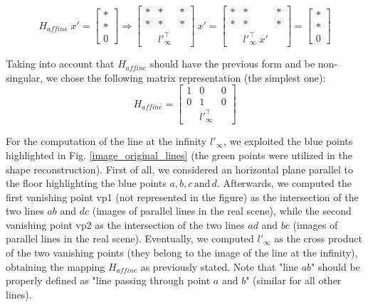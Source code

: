 \documentclass[11pt, oneside]{article}
\begin{document}
\begin{equation}
	H_{affine} \; x' = 
	\begin{bmatrix}
		* \\ * \\ 0
	\end{bmatrix}
	\Rightarrow
	\begin{bmatrix}
		* & * & * \\ * & * & * \\ & {l'}^{\intercal}_{\infty} &
	\end{bmatrix}
	\: x' =
	\begin{bmatrix}
		* & * & * \\ * & * & * \\ & {l'}^{\intercal}_{\infty} \; x' &
	\end{bmatrix}
	=
	\begin{bmatrix}
		* \\ * \\ 0
	\end{bmatrix}
\end{equation}

Taking into account that $H_{affine}$ should have the previous form and be non-singular, we chose the following matrix representation (the simplest one):
\begin{equation}
	H_{affine} =
	\begin{bmatrix}
		1 & 0 & 0 \\ 0 & 1 & 0 \\ & {l'}^{\intercal}_{\infty} &
	\end{bmatrix}
\end{equation}

For the computation of the line at the infinity $l'_{\infty}$, we exploited the blue points highlighted in Fig. \ref{image_original_lines} (the green points were utilized in the shape reconstruction). First of all, we considered an horizontal plane parallel to the floor highlighting the blue points $a, b, c \, \text{and}\, d$. Afterwards, we computed the first vanishing point vp1 (not represented in the figure) as the intersection of the two lines $ab$ and $dc$ (images of parallel lines in the real scene), while the second vanishing point vp2 as the intersection of the two lines $ad$ and $bc$ (images of parallel lines in the real scene). Eventually, we computed $l'_{\infty}$ as the cross product of the two vanishing points (they belong to the image of the line at the infinity), obtaining the mapping $H_{affine}$ as previously stated. Note that "line $ab$" should be properly defined as "line passing through point $a$ and $b$" (similar for all other lines).
\end{document}
